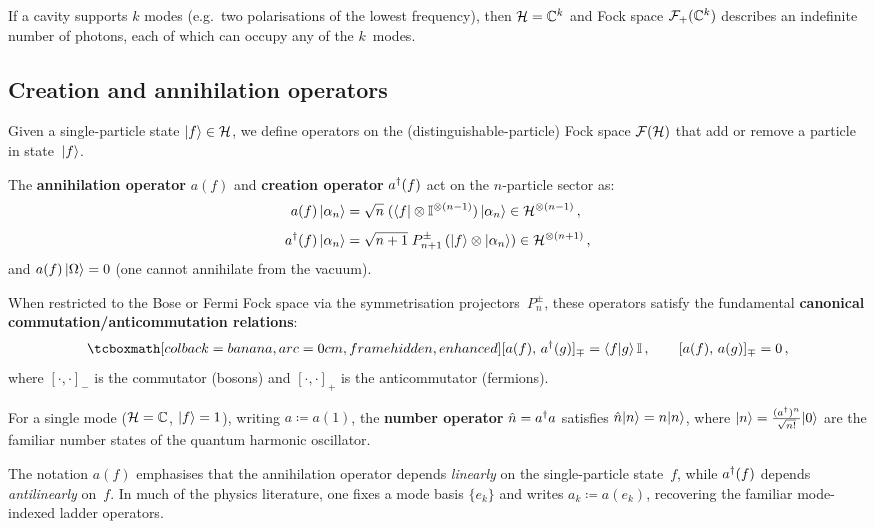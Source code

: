 \begin{example}\label{ex:multi-mode}
  If a cavity supports $k$ modes (e.g.\ two polarisations of the
  lowest frequency), then $\mathcal{H} = \mathbb{C}^k$ and Fock space
  $\mathcal{F}_+(\mathbb{C}^k)$ describes an indefinite number of photons,
  each of which can occupy any of the $k$~modes.
\end{example}

\subsection{Creation and annihilation operators}%
\label{sec:creation-annihilation}

Given a single-particle state $\lvert f \rangle \in \mathcal{H}$, we define operators
on the (distinguishable-particle) Fock space $\mathcal{F}(\mathcal{H})$
that add or remove a particle in state~$\lvert f \rangle$.

\begin{definition}%
\label{def:annihilation-creation}
  The \textbf{annihilation operator} $a(f)$ and \textbf{creation
  operator} $a^\dagger(f)$ act on the $n$-particle sector as:
  \begin{align}
    a(f)\,\lvert \alpha_n \rangle
    &= \sqrt{n}\;(\langle f \rvert \otimes \mathbb{I}^{\otimes(n-1)})\,\lvert \alpha_n \rangle
    \in \mathcal{H}^{\otimes(n-1)}\,,
    \label{eq:annihilate}
    \\[4pt]
    a^\dagger(f)\,\lvert \alpha_n \rangle
    &= \sqrt{n+1}\; P_{n+1}^\pm\,(\lvert f \rangle \otimes \lvert \alpha_n \rangle)
    \in \mathcal{H}^{\otimes(n+1)}\,,
    \label{eq:create}
  \end{align}
  and $a(f)\,\lvert \Omega \rangle = 0$ (one cannot annihilate from the vacuum).
\end{definition}

When restricted to the Bose or Fermi Fock space via the
symmetrisation projectors~$P_n^\pm$, these operators satisfy the
fundamental \textbf{canonical commutation/anticommutation relations}:
\begin{equation}\label{eq:ccr-car}
  \eqbox{[a(f),\, a^\adj(g)]_\mp = \braket{f}{g}\,\One}\,,
  \qquad
  [a(f),\, a(g)]_\mp = 0\,,
\end{equation}
where $[\cdot,\cdot]_-$ is the commutator (bosons) and
$[\cdot,\cdot]_+$ is the anticommutator (fermions).

\begin{keyresult}
  For a single mode ($\mathcal{H} = \mathbb{C}$, $\lvert f \rangle = 1$), writing
  $a \coloneqq a(1)$, the \textbf{number operator}
  $\hat{n} = a^\dagger a$ satisfies
  $\hat{n}\lvert n \rangle = n\lvert n \rangle$, where
  $\lvert n \rangle = \frac{(a^\dagger)^n}{\sqrt{n!}}\lvert 0 \rangle$
  are the familiar number states of the quantum harmonic oscillator.
\end{keyresult}

\begin{remark}
  The notation $a(f)$ emphasises that the annihilation operator depends
  \emph{linearly} on the single-particle state~$f$, while $a^\dagger(f)$
  depends \emph{antilinearly} on~$f$.  In much of the physics
  literature, one fixes a mode basis $\{e_k\}$ and writes
  $a_k \coloneqq a(e_k)$, recovering the familiar mode-indexed ladder
  operators.
\end{remark}
